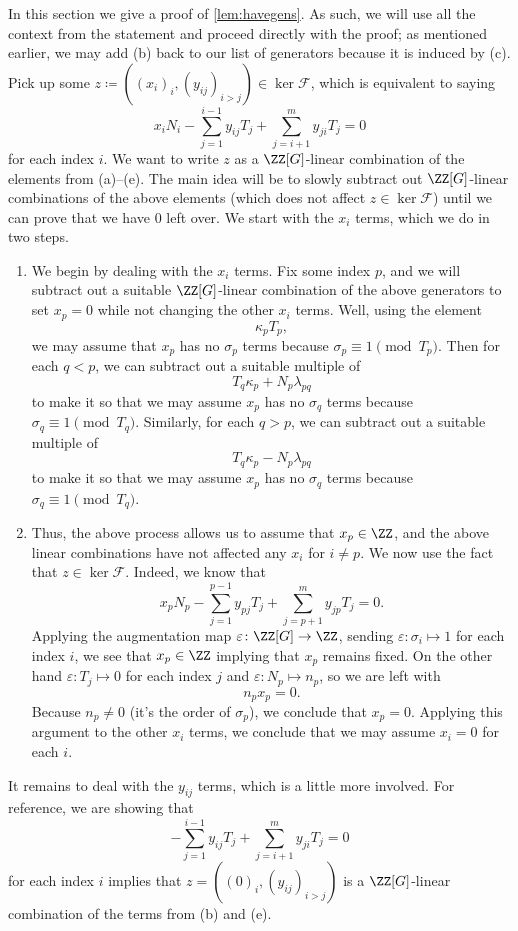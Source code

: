 
In this section we give a proof of \autoref{lem:havegens}. As such, we will use all the context from the statement and proceed directly with the proof; as mentioned earlier, we may add (b) back to our list of generators because it is induced by (c). Pick up some $z\coloneqq((x_i)_i,(y_{ij})_{i>j})\in\ker\mathcal F$, which is equivalent to saying
\[x_iN_i-\sum_{j=1}^{i-1}y_{ij}T_j+\sum_{j=i+1}^my_{ji}T_j=0\]
for each index $i$. We want to write $z$ as a $\ZZ[G]$-linear combination of the elements from (a)--(e). The main idea will be to slowly subtract out $\ZZ[G]$-linear combinations of the above elements (which does not affect $z\in\ker\mathcal F$) until we can prove that we have $0$ left over. We start with the $x_i$ terms, which we do in two steps.
\begin{enumerate}
	\item We begin by dealing with the $x_i$ terms. Fix some index $p$, and we will subtract out a suitable $\ZZ[G]$-linear combination of the above generators to set $x_p=0$ while not changing the other $x_i$ terms. Well, using the element
	\[\kappa_pT_p,\tag{a}\]
	we may assume that $x_p$ has no $\sigma_p$ terms because $\sigma_p\equiv1\pmod{T_p}$. Then for each $q<p$, we can subtract out a suitable multiple of
	\[T_q\kappa_p+N_p\lambda_{pq}\tag{c}\]
	to make it so that we may assume $x_p$ has no $\sigma_q$ terms because $\sigma_q\equiv1\pmod{T_q}$. Similarly, for each $q>p$, we can subtract out a suitable multiple of
	\[T_q\kappa_p-N_p\lambda_{pq}\tag{d}\]
	to make it so that we may assume $x_p$ has no $\sigma_q$ terms because $\sigma_q\equiv1\pmod{T_q}$.

	\item Thus, the above process allows us to assume that $x_p\in\ZZ$, and the above linear combinations have not affected any $x_i$ for $i\ne p$. We now use the fact that $z\in\ker\mathcal F$. Indeed, we know that
	\[x_pN_p-\sum_{j=1}^{p-1}y_{pj}T_j+\sum_{j=p+1}^my_{jp}T_j=0.\]
	Applying the augmentation map $\varepsilon\colon\ZZ[G]\to\ZZ$, sending $\varepsilon\colon\sigma_i\mapsto1$ for each index $i$, we see that $x_p\in\ZZ$ implying that $x_p$ remains fixed. On the other hand $\varepsilon\colon T_j\mapsto0$ for each index $j$ and $\varepsilon\colon N_p\mapsto n_p$, so we are left with
	\[n_px_p=0.\]
	Because $n_p\ne0$ (it's the order of $\sigma_p$), we conclude that $x_p=0$. Applying this argument to the other $x_i$ terms, we conclude that we may assume $x_i=0$ for each $i$.
\end{enumerate}
It remains to deal with the $y_{ij}$ terms, which is a little more involved. For reference, we are showing that
\[-\sum_{j=1}^{i-1}y_{ij}T_j+\sum_{j=i+1}^my_{ji}T_j=0\]
for each index $i$ implies that $z=((0)_i,(y_{ij})_{i>j})$ is a $\ZZ[G]$-linear combination of the terms from (b) and (e).

